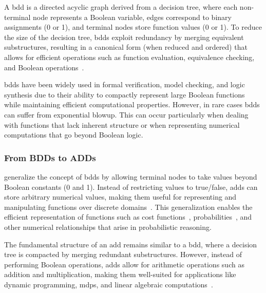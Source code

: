 A \gls{bdd} is a directed acyclic graph derived from a decision tree, where each non-terminal node represents a Boolean variable, edges correspond to binary assignments (0 or 1), and terminal nodes store function values (0 or 1).
To reduce the size of the decision tree, \glspl{bdd} exploit redundancy by merging equivalent substructures, resulting in a canonical form (when reduced and ordered) that allows for efficient operations such as function evaluation, equivalence checking, and Boolean operations~\cite{bryant1986graph}.

\glspl{bdd} have been widely used in formal verification, model checking, and logic synthesis due to their ability to compactly represent large Boolean functions while maintaining efficient computational properties.
However, in rare cases \glspl{bdd} can suffer from exponential blowup. This can occur particularly when dealing with functions that lack inherent structure or when representing numerical computations that go beyond Boolean logic.

\subsubsection{From BDDs to ADDs}\label{subsubsec:adds}
 generalize the concept of \glspl{bdd} by allowing terminal nodes to take values beyond Boolean constants (0 and 1).
Instead of restricting values to true/false, \glspl{add} can store arbitrary numerical values, making them useful for representing and manipulating functions over discrete domains~\cite{bahar1997algebric}.
This generalization enables the efficient representation of functions such as cost functions~\cite{kwiatkowska2004probabilistic}, probabilities~\cite{baier1997symbolic}, and other numerical relationships that arise in probabilistic reasoning.

The fundamental structure of an \gls{add} remains similar to a \gls{bdd}, where a decision tree is compacted by merging redundant substructures.
However, instead of performing Boolean operations, \glspl{add} allow for arithmetic operations such as addition and multiplication, making them well-suited for applications like dynamic programming, \glspl{mdp}, and linear algebraic computations~\cite{bahar1997algebric}.

